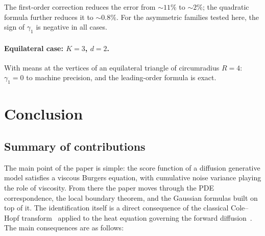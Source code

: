 \documentclass[11pt]{article}
\begin{document}
The first-order correction reduces the error from ${\sim}11\%$ to ${\sim}2\%$; the quadratic formula further reduces it to ${\sim}0.8\%$.
For the asymmetric families tested here, the sign of $\gamma_1$ is negative in all cases.

\paragraph{Equilateral case: $K = 3$, $d = 2$.}
With means at the vertices of an equilateral triangle of circumradius $R = 4$:
$\gamma_1 = 0$ to machine precision, and the leading-order formula is exact.




\section{Conclusion}\label{sec:conclusion}

\subsection{Summary of contributions}

The main point of the paper is simple: the score function of a diffusion generative model satisfies a viscous Burgers equation, with cumulative noise variance playing the role of viscosity. From there the paper moves through the PDE correspondence, the local boundary theorem, and the Gaussian formulas built on top of it. The identification itself is a direct consequence of the classical Cole--Hopf transform~\citep{hopf1950partial, cole1951quasi} applied to the heat equation governing the forward diffusion~\citep{sohl2015deep, song2021score}. The main consequences are as follows:
\end{document}
